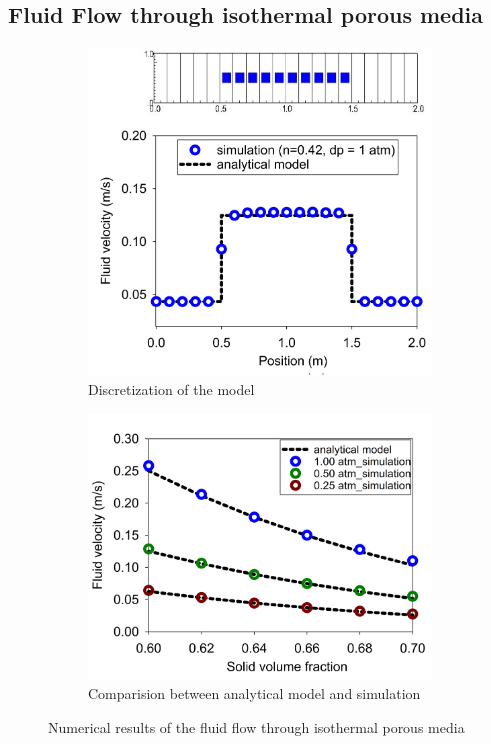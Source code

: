 \documentclass[preprint,12pt]{elsarticle}
\begin{document}
\subsection{\textsf{Fluid Flow through isothermal porous media}}
%
%
\begin{figure}[h]
\center
\begin{subfigure}[c]{0.5\linewidth}
\includegraphics[width=\linewidth]{porousflow1.jpg}
\caption{Discretization of the model}
\label{fig:3c}
\end{subfigure}\hfill    
\begin{subfigure}[d]{0.5\linewidth}
\includegraphics[width=\linewidth]{porousflow.jpg}
\caption{Comparision between analytical model and simulation}
\label{fig:3d}
\end{subfigure}
\caption{Numerical results of the fluid flow through isothermal porous media}
\label{fig:porousflow}
\end{figure}
\end{document}
